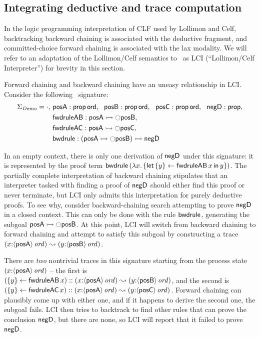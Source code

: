 \subsection{Integrating deductive and trace computation}

In the logic programming interpretation of CLF used by Lollimon and
Celf, backtracking backward chaining is associated with the deductive
fragment, and committed-choice forward chaining is associated with the
lax modality. We will refer to an adaptation of the Lollimon/Celf
semantics to \sls~as LCI (``Lollimon/Celf Interpreter'') for
brevity in this section.

Forward chaining and backward chaining have an uneasy relationship in
LCI. Consider the following \sls~signature:
\begin{align*}
 \Sigma_{\it Demo} = \cdot, 
~&{\sf posA} : {\sf prop}\,{\sf ord}, 
~~{\sf posB} : {\sf prop}\,{\sf ord}, 
~~{\sf posC} : {\sf prop}\,{\sf ord}, 
~~{\sf negD} : {\sf prop},\\
~&{\sf fwdruleAB} : {\sf posA} \rightarrowtail {\ocircle}{\sf posB},\\
~&{\sf fwdruleAC} : {\sf posA} \rightarrowtail {\ocircle}{\sf posC},\\
~&{\sf bwdrule} : ({\sf posA} \rightarrowtail {\ocircle}{\sf posB}) \rightarrowtail {\sf negD}
\end{align*}

In an empty context, there is only one derivation of ${\sf negD}$
under this signature: it is represented by the proof term ${\sf
  bwdrule}\,(\lambda x.\,\{{\sf let}\,{\{{y}\} \leftarrow {{\sf
      fwdruleAB}\,x}}\,{\sf in}\, {y} \})$. The partially complete interpretation of
backward chaining stipulates that an interpreter tasked with finding a
proof of ${\sf negD}$ should either find this proof or never
terminate, but LCI only admits this interpretation for purely
deductive proofs. To see why, consider backward-chaining search
attempting to prove ${\sf negD}$ in a closed context.  This can only
be done with the rule ${\sf bwdrule}$, generating the subgoal ${\sf
  posA} \rightarrowtail {\ocircle}{\sf posB}$.  At this point, LCI will switch
from backward chaining to forward chaining and attempt to satisfy this
subgoal by constructing a trace $(x{:}{\langle {\sf posA} \rangle}\,{{\it ord}})
\leadsto (y{:}{\langle {\sf posB} \rangle}\,{{\it ord}})$.

There are {\it two} nontrivial traces in this signature starting from
the process state $(x{:}{\langle {\sf posA} \rangle}\,{{\it ord}})$ -- the first is
$(\{{y}\} \leftarrow {{\sf fwdruleAB}\,x}) :: (x{:}{\langle {\sf posA} \rangle}\,{{\it ord}})
\leadsto (y{:}{\langle {\sf posB} \rangle}\,{{\it ord}})$, and the second is
$(\{{y}\} \leftarrow {{\sf fwdruleAC}\,x})::(x{:}{\langle {\sf posA} \rangle}\,{{\it ord}})
\leadsto (y{:}{\langle {\sf posC} \rangle}\,{{\it ord}})$.  Forward chaining can
plausibly come up with either one, and if it happens to derive the
second one, the subgoal fails. LCI then tries to backtrack to find
other rules that can prove the conclusion ${\sf negD}$, but there are
none, so LCI will report that it failed to prove ${\sf negD}$.

